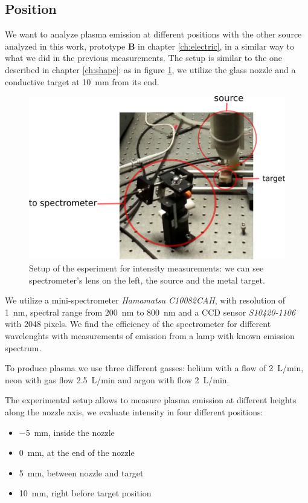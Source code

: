 \subsection{Position}
We want to analyze plasma emission at different positions with the other source analyzed in this work, prototype \textbf{B} in chapter \ref{ch:electric}, in a similar way to what we did in the previous measurements. The setup is similar to the one described in chapter \ref{ch:shape}: as in figure \ref{fig:app2}, we utilize the glass nozzle and a conductive target at \SI{10}{\milli\meter} from its end.
\begin{figure}
\centering
\includegraphics[width=.7\textwidth]{Images/Spectroscopy/app2_lines.png}
\caption{Setup of the esperiment for intensity measurements: we can see spectrometer's lens on the left, the source and the metal target.}
\label{fig:app2}
\end{figure}

We utilize a mini-spectrometer \emph{Hamamatsu C10082CAH}, with resolution of \SI{1}{\nano\meter}, spectral range from \SI{200}{\nano\meter} to \SI{800}{\nano\meter} and a CCD sensor \emph{S10420-1106} with \num{2048} pixels. We find the efficiency of the spectrometer for different wavelenghts with measurements of emission from a lamp with known emission spectrum.

To produce plasma we use three different gasses: helium with a flow of \SI{2}{\liter/\minute}, neon with gas flow \SI{2.5}{\liter/\minute} and argon with flow \SI{2}{\liter/\minute}.

The experimental setup allows to measure plasma emission at different heights along the nozzle axis, we evaluate intensity in four different positions:
\begin{itemize}
 \item \SI{-5}{\milli\meter}, inside the nozzle
 \item \SI{0}{\milli\meter}, at the end of the nozzle
 \item \SI{5}{\milli\meter}, between nozzle and target
 \item \SI{10}{\milli\meter}, right before target position
\end{itemize}

